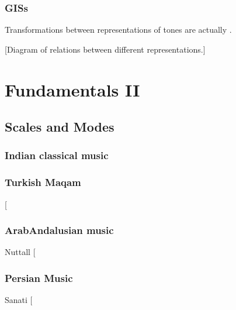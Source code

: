 \documentclass[letterpaper,10pt,english]{sphinxmanual}
\begin{document}
\subsection{GISs}
\label{\detokenize{1_fundamentals:giss}}
Transformations between representations of tones are actually .

{[}Diagram of relations between different representations.{]}


\chapter{Fundamentals II}
\label{\detokenize{1_fundamentals:fundamentals-ii}}

\section{Scales and Modes}
\label{\detokenize{1_fundamentals:scales-and-modes}}

\subsection{Indian classical music}
\label{\detokenize{1_fundamentals:indian-classical-music}}

\subsection{Turkish Maqam}
\label{\detokenize{1_fundamentals:turkish-maqam}}
 {[}\sphinxcite{8_bibliography:id22}{]}


\subsection{Arab\sphinxhyphen{}Andalusian music}
\label{\detokenize{1_fundamentals:arab-andalusian-music}}
Nuttall  {[}\sphinxcite{8_bibliography:id30}{]}


\subsection{Persian Music}
\label{\detokenize{1_fundamentals:persian-music}}
Sanati {[}\sphinxcite{8_bibliography:id28}{]}
\end{document}
